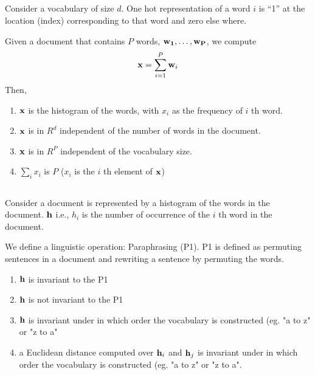 \begin{frame}
\section{}
Consider a vocabulary of size $d$. One hot representation of a word $i$ is ``1'' at the location
(index) corresponding to that word and zero else where.

Given a document that contains $P$ words,  ${\bf w_1, \ldots, w_P}$, we compute
\[ {\bf x} = \sum_{i=1}^P {\bf w}_i \]
Then,
\begin{enumerate}
\item ${\bf x}$ is the histogram of the words, with $x_i$ as the frequency of $i$ th word.    %
\item ${\bf x}$ is in $R^d$ independent of the number of words in the document.   %
\item ${\bf x}$ is in $R^P$ independent of the vocabulary size.
\item $\sum_{i} {x}_i$ is $P$ ($x_i$ is the $i$ th element of ${\bf x}$)    %
\end{enumerate}
\end{frame}

\begin{frame}
\section{}
Consider a document is represented by a histogram of the words in the document. ${\bf h}$ i.e., $h_i$ is the
number of occurrence of the $i$ th word in the document.

We define a linguistic operation: Paraphrasing (P1). P1 is defined as permuting sentences in a document and rewriting a sentence by permuting the words.

\begin{enumerate}
\item ${\bf h}$ is invariant to the P1    %
\item ${\bf h}$ is not invariant to the P1
\item ${\bf h}$ is invariant under in which order the vocabulary is constructed (eg. "a to z" or "z to a"
\item a Euclidean distance computed over ${\bf h}_i$ and ${\bf h}_j$ is invariant under in which order the vocabulary is constructed (eg. "a to z" or "z to a".   %
\end{enumerate}
\end{frame}


